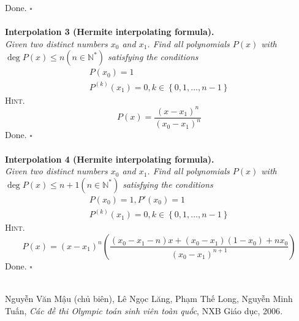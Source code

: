 \documentclass{article}
\numberwithin{equation}{section}
\begin{document}
Done. \hfill $\square$\\ 
\\
\textbf{Interpolation 3 (Hermite interpolating formula).} \\
\textit{Given two distinct numbers $x_0$ and $x_1$. Find all polynomials $P(x)$ with $\deg P(x) \le n (n \in \mathbb{N}^{*})$ satisfying the conditions}
\begin{align}
P\left( {{x_0}} \right) = 1\\
{P^{\left( k \right)}}\left( {{x_1}} \right) = 0,k \in \left\{ {0,1, \ldots ,n - 1} \right\}
\end{align}
\textsc{Hint.} 
\begin{equation}
P\left( x \right) = \frac{{{{\left( {x - {x_1}} \right)}^n}}}{{{{\left( {{x_0} - {x_1}} \right)}^n}}}
\end{equation}
Done. \hfill $\square$\\
\\
\textbf{Interpolation 4 (Hermite interpolating formula).} \\
\textit{Given two distinct numbers $x_0$ and $x_1$. Find all polynomials $P(x)$ with $\deg P(x) \le n+1 (n \in \mathbb{N}^{*})$ satisfying the conditions}
\begin{align}
P\left( {{x_0}} \right) = 1,P'\left( {{x_0}} \right) = 1\\
{P^{\left( k \right)}}\left( {{x_1}} \right) = 0,k \in \left\{ {0,1, \ldots ,n - 1} \right\}
\end{align}
\textsc{Hint.} 
\begin{equation}
P\left( x \right) = {\left( {x - {x_1}} \right)^n}\left( {\frac{{\left( {{x_0} - {x_1} - n} \right)x + \left( {{x_0} - {x_1}} \right)\left( {1 - {x_0}} \right) + n{x_0}}}{{{{\left( {{x_0} - {x_1}} \right)}^{n + 1}}}}} \right)
\end{equation}
Done. \hfill $\square$\\
\\
\newpage
\begin{thebibliography}{999}
 \foreignlanguage{vietnamese}{Nguyễn Văn Mậu (chủ biên), Lê Ngọc Lăng, Phạm Thế Long, Nguyễn Minh Tuấn, \textit{Các đề thi Olympic toán sinh viên toàn quốc}, NXB Giáo dục, 2006}.
\end{thebibliography}
\end{document}
